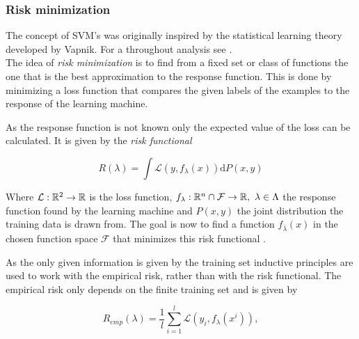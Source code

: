 \subsubsection{Risk minimization}
The concept of SVM's was originally inspired by the statistical learning theory developed by Vapnik. For a throughout analysis see \cite{Vapnik1998}. \\
The idea of \emph{risk minimization} is to find from a fixed set or class of functions the one that is the best approximation to the response function. This is done by minimizing a loss function that compares the given labels of the examples to the response of the learning machine.

As the response function is not known only the expected value of the loss can be calculated. It is given by the \emph{risk functional} 

\begin{equation}
	R(\lambda) = \int{\mathcal{L}(y,f_{\lambda}(x))\text{d}P(x,y)}
\label{risk_func}
\end{equation}

Where \(\mathcal{L}: \mathbb{R}^2 \to \mathbb{R}\) is the loss function, \(f_{\lambda}: \mathbb{R}^{n}\cap\mathcal{F} \to \mathbb{R}, ~ \lambda \in \Lambda\) the response function found by the learning machine and \(P(x,y)\) the joint distribution the training data is drawn from. The goal is now to find a function \(f_{\bar{\lambda}}(x)\) in the chosen function space \(\mathcal{F}\) that minimizes this risk functional \cite{Vapnik1999}.

As the only given information is given by the training set inductive principles are used to work with the empirical risk, rather than with the risk functional.
The empirical risk only depends on the finite training set  and is given by 


\begin{equation}
	R_{emp}(\lambda) = \frac{1}{l} \sum_{i = 1}^{l}\mathcal{L}(y_i,f_{\lambda}(x^i)),
\label{emp_risk}
\end{equation}

